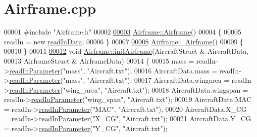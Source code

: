 \hypertarget{_airframe_8cpp_source}{}\section{Airframe.\+cpp}
\label{_airframe_8cpp_source}

\begin{DoxyCode}
00001 \textcolor{preprocessor}{#include "Airframe.h"}
00002 
\hyperlink{group___airframe_a5e6632c7d0c5bc5b889de6cc2407944f}{00003} \hyperlink{group___airframe_a5e6632c7d0c5bc5b889de6cc2407944f}{Airframe::Airframe}()
00004 \{
00005     readIn = \textcolor{keyword}{new} \hyperlink{classread_in_data}{readInData};
00006 \}
00007 
\hyperlink{group___airframe_af849116afbf7c4d7d2d5c189ff68cb7d}{00008} \hyperlink{group___airframe_af849116afbf7c4d7d2d5c189ff68cb7d}{Airframe::~Airframe}()
00009 \{
00010 \}
00011 
\hyperlink{group___airframe_a57b5f7a74d11723186f34fc183e1581b}{00012} \textcolor{keywordtype}{void} \hyperlink{group___airframe_a57b5f7a74d11723186f34fc183e1581b}{Airframe::initAirframe}(AircraftStruct & AircraftData,
00013                             AirframeStruct & AirframeData)
00014 \{
00015     mass = readIn->\hyperlink{classread_in_data_a9ae979e74958b43424cb6cf4a22043d7}{readInParameter}(\textcolor{stringliteral}{"mass"}, \textcolor{stringliteral}{"Aircraft.txt"});
00016     AircraftData.mass       = readIn->\hyperlink{classread_in_data_a9ae979e74958b43424cb6cf4a22043d7}{readInParameter}(\textcolor{stringliteral}{"mass"}, \textcolor{stringliteral}{"Aircraft.txt"});
00017     AircraftData.wingarea   = readIn->\hyperlink{classread_in_data_a9ae979e74958b43424cb6cf4a22043d7}{readInParameter}(\textcolor{stringliteral}{"wing\_area"}, \textcolor{stringliteral}{"Aircraft.txt"});
00018     AircraftData.wingspan   = readIn->\hyperlink{classread_in_data_a9ae979e74958b43424cb6cf4a22043d7}{readInParameter}(\textcolor{stringliteral}{"wing\_span"}, \textcolor{stringliteral}{"Aircraft.txt"});
00019     AircraftData.MAC        = readIn->\hyperlink{classread_in_data_a9ae979e74958b43424cb6cf4a22043d7}{readInParameter}(\textcolor{stringliteral}{"MAC"}, \textcolor{stringliteral}{"Aircraft.txt"});
00020     AircraftData.X\_CG       = readIn->\hyperlink{classread_in_data_a9ae979e74958b43424cb6cf4a22043d7}{readInParameter}(\textcolor{stringliteral}{"X\_CG"}, \textcolor{stringliteral}{"Aircraft.txt"});
00021     AircraftData.Y\_CG       = readIn->\hyperlink{classread_in_data_a9ae979e74958b43424cb6cf4a22043d7}{readInParameter}(\textcolor{stringliteral}{"Y\_CG"}, \textcolor{stringliteral}{"Aircraft.txt"});

\end{DoxyCode}

